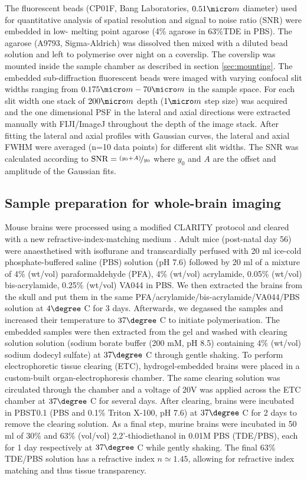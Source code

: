 \documentclass[12pt]{spieman}  %
\begin{document}
\begin{spacing}{2}
The fluorescent beads (CP01F, Bang Laboratories, $0.51 \micro m$ diameter) used for quantitative analysis of spatial resolution and signal to noise ratio (SNR) were embedded in low- melting point agarose (4\% agarose in 63\%TDE in PBS). The agarose (A9793, Sigma-Aldrich) was dissolved then mixed with a diluted bead solution and left to polymerise over night on a coverslip. The coverslip was mounted inside the sample chamber as described in section \ref{sec:mounting}. The embedded sub-diffraction fluorescent beads were imaged with varying confocal slit widths ranging from $0.175 \micro m-70 \micro m$ in the sample space. For each slit width one stack of $200\micro m$ depth ($1 \micro m$ step size) was acquired and the one dimensional PSF in the lateral and axial directions were extracted manually with FIJI/ImageJ throughout the depth of the image stack. After fitting the lateral and axial profiles with Gaussian curves, the lateral and axial FWHM were averaged (n=10 data points) for different slit widths. The SNR was calculated according to $\text{SNR} = \nicefrac{(y_0 + A)}{y_0}$ where $y_0$ and $A$ are the offset and amplitude of the Gaussian fits.

\subsection{Sample preparation for whole-brain imaging}

Mouse brains were processed using a modified CLARITY protocol \cite{Chung2013} and cleared with a new refractive-index-matching medium \cite{Costantini}. Adult mice (post-natal day 56) were anaesthetised with isoflurane and transcardially perfused with 20 ml ice-cold phosphate-buffered saline (PBS) solution (pH 7.6) followed by 20 ml of a mixture of 4\% (wt/vol) paraformaldehyde (PFA), 4\% (wt/vol) acrylamide, 0.05\% (wt/vol) bis-acrylamide, 0.25\% (wt/vol) VA044 in PBS. We then extracted the brains from the skull and put them in the same PFA/acrylamide/bis-acrylamide/VA044/PBS solution at $4 \degree$ C for 3 days. Afterwards, we degassed the samples and increased their temperature to $37 \degree$ C to initiate polymerisation. The embedded samples were then extracted from the gel and washed with clearing solution solution (sodium borate buffer (200 mM, pH 8.5) containing 4\% (wt/vol) sodium dodecyl sulfate) at $37 \degree $ C through gentle shaking. To perform electrophoretic tissue clearing (ETC), hydrogel-embedded brains were placed in a custom-built organ-electrophoresis chamber. The same clearing solution was circulated through the chamber and a voltage of 20V was applied across the ETC chamber at $37 \degree$ C for several days. After clearing, brains were incubated in PBST0.1 (PBS and 0.1\% Triton X-100, pH 7.6) at $37 \degree$ C for 2 days to remove the clearing solution. As a final step, murine brains were incubated in 50 ml of 30\% and 63\% (vol/vol) 2,2'-thiodiethanol in 0.01M PBS (TDE/PBS), each for 1 day respectively at $37 \degree$ C while gently shaking. The final 63\% TDE/PBS solution has a refractive index $n\simeq 1.45$, allowing for refractive index matching and thus tissue transparency.




\end{spacing}
\end{document}
